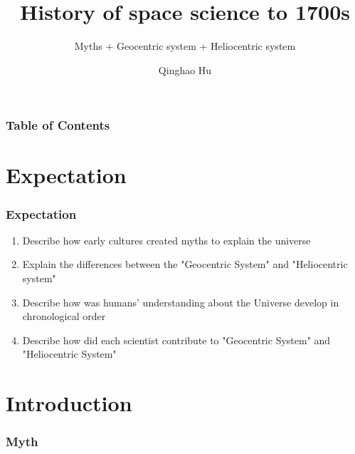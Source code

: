 \documentclass[10pt]{beamer}
\title[SES4U]
{History of space science to 1700s}
\subtitle{Myths + Geocentric system + Heliocentric system}
\author{Qinghao Hu}
\begin{document}
\frame{\titlepage}

\begin{frame}
  \frametitle{Table of Contents}
  \tableofcontents
\end{frame}

\section{Expectation}
\begin{frame}
  \frametitle{Expectation}
  \begin{enumerate}
    \item Describe how early cultures created myths to explain the universe
    \item Explain the differences between the "Geocentric System" and "Heliocentric system"
    \item Describe how was humans' understanding about the Universe develop in chronological order
    \item Describe how did each scientist contribute to "Geocentric System" and "Heliocentric System"
  \end{enumerate}
\end{frame}

\section{Introduction}
\begin{frame}
  \frametitle{Myth}
\end{frame}
\end{document}
